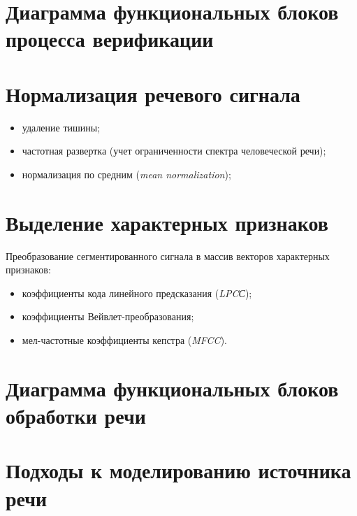 \documentclass[12pt]{article}
\newcommand{\important}[1]{\emph{#1}}
\begin{document}
\section{Диаграмма функциональных блоков процесса верификации}

\begin{figure}[h!]
\end{figure}

\section{Нормализация речевого сигнала}

\begin{itemize}
    \item удаление тишины;
    \item частотная развертка (учет ограниченности спектра человеческой речи);
    \item нормализация по средним (\important{mean normalization});
\end{itemize}

\section{Выделение характерных признаков}

Преобразование сегментированного сигнала в массив векторов характерных признаков:
\begin{itemize}
    \item коэффициенты кода линейного предсказания (\important{LPCС});
    \item коэффициенты Вейвлет-преобразования;
    \item мел-частотные коэффициенты кепстра (\important{MFCC}).
\end{itemize}

\section{Диаграмма функциональных блоков обработки речи}

\begin{figure}[h!]
\end{figure}

\section{Подходы к моделированию источника речи}
\end{document}
